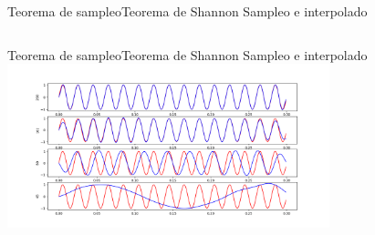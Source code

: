  \begin{frame}[c]{Teorema de sampleo}{Teorema de Shannon}
    \handsonicon
    Sampleo e interpolado
       \begin{columns}[c]
          \hspace{2pt}
          \begin{column}{.5\textwidth}
             
          \end{column}
          \hspace{2pt}
          \vrule
          \hspace{2pt}
          \begin{column}{.5\textwidth}
             
          \end{column}
          \hspace{2pt}
       \end{columns}
    \vfill
 \end{frame}
 \begin{frame}[t]{Teorema de sampleo}{Teorema de Shannon}
    \handsonicon
    Sampleo e interpolado
    \center\includegraphics[width=0.7\textwidth]{1_clase/teorema_sampleo_interpolado}
    \vfill
 \end{frame}
